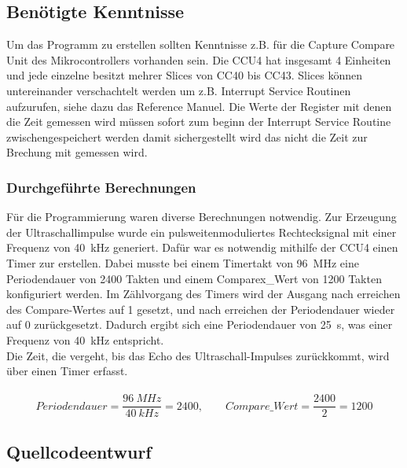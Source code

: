 \subsection{Benötigte Kenntnisse}
Um das Programm zu erstellen sollten Kenntnisse z.B. für die Capture Compare Unit des Mikrocontrollers vorhanden sein. Die CCU4 hat insgesamt 4 Einheiten und jede einzelne besitzt mehrer Slices von CC40 bis CC43. Slices können untereinander verschachtelt werden um z.B. Interrupt Service Routinen aufzurufen, siehe dazu das Reference Manuel.
Die Werte der Register mit denen die Zeit gemessen wird müssen sofort zum beginn der Interrupt Service Routine zwischengespeichert werden damit sichergestellt wird das nicht die Zeit zur Brechung mit gemessen wird.\\

\subsubsection{Durchgeführte Berechnungen}
Für die Programmierung waren diverse Berechnungen notwendig. Zur Erzeugung der Ultraschallimpulse wurde ein pulsweitenmoduliertes Rechtecksignal mit einer Frequenz von 40~kHz generiert. Dafür war es notwendig mithilfe der CCU4 einen Timer zur erstellen. Dabei musste bei einem Timertakt von 96~MHz eine Periodendauer von 2400 Takten und einem Comparex\_Wert von 1200 Takten konfiguriert werden. Im Zählvorgang des Timers wird der Ausgang nach erreichen des Compare-Wertes auf 1 gesetzt, und nach erreichen der Periodendauer wieder auf 0 zurückgesetzt. Dadurch ergibt sich eine Periodendauer von 25~\textmu s, was einer Frequenz von 40~kHz entspricht.\\
Die Zeit, die vergeht, bis das Echo des Ultraschall-Impulses zurückkommt, wird über einen Timer erfasst. 
\onehalfspacing \\ \\
\[\displaystyle Periodendauer=\frac{96~MHz}{40~kHz} = 2400,\qquad	 Compare\_Wert=\frac{2400}{2} = 1200 \] 
\singlespacing


\subsection{Quellcodeentwurf}

